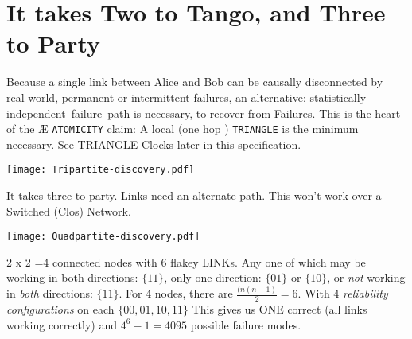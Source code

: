 \documentclass[../../../OAE-SPEC-MAIN.tex]{subfiles}
\begin{document}
 
\section{It takes Two to Tango, and Three to Party}


Because a single link between Alice and Bob can be causally disconnected by real-world, permanent or intermittent failures, an alternative: statistically--independent--failure--path is necessary, to recover from \LINK Failures.  %
This is the heart of the  Æ \texttt{ATOMICITY} claim:   A local (one hop \LINK) \texttt{TRIANGLE}  is the minimum necessary.  See TRIANGLE Clocks later in this specification.

 \begin{marginfigure}
        \texttt{[image: Tripartite-discovery.pdf]}
  \caption{It takes three to party.  Links need an alternate path. This won't work over a Switched (Clos) Network.  
}
    \vspace{16pt}
\end{marginfigure}



 \begin{marginfigure}
      \texttt{[image: Quadpartite-discovery.pdf]}
  \caption{2 x 2 =4  connected nodes with 6 flakey LINKs. Any one of which may be working in both directions: $\{11\}$, only one direction: $\{01\}$ or $\{10\}$, or \emph{not}-working in  \emph{both} directions: $\{11\}$. For 4 nodes, there are $\frac{(n(n-1)}{2} = 6$. With 4  \emph{reliability configurations} on each \LINK $\{00,01,10,11\}$ This gives us ONE correct (all links working correctly) and  $4^6-1 = 4095$ possible failure modes.}%
   \vspace{10pt}
\end{marginfigure}
\end{document}
